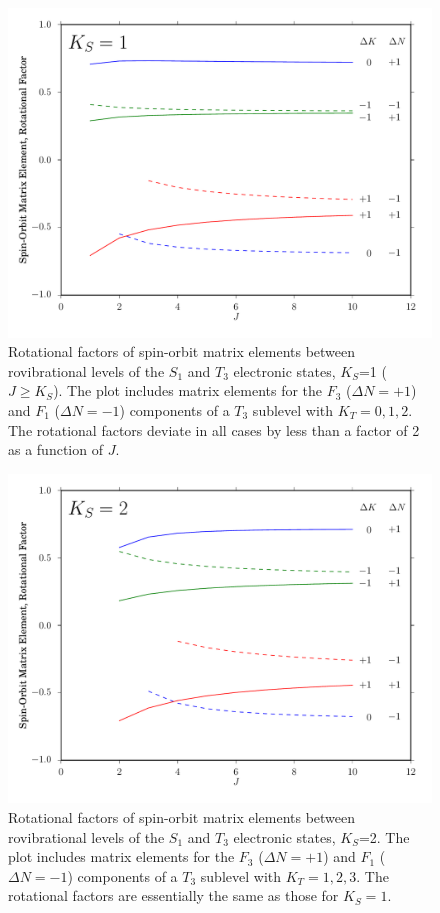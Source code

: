 \documentclass[12pt]{mitthesis}
\begin{document}
\begin{figure}[p]
  \caption{Rotational factors of spin-orbit matrix elements between
    rovibrational levels of the $S_1$ and $T_3$ electronic states,
    $K_S$=1 ($J \ge K_S$).  The plot includes matrix elements for the
    $F_3$ ($\Delta N = +1$) and $F_1$ ($\Delta N = -1$) components of
    a $T_3$ sublevel with $K_T=0,1,2$.  The rotational factors deviate
    in all cases by less than a factor of 2 as a function of $J$.}
  \label{fig:rotational-factors-1}
  \centering
  \includegraphics[width=6in]{rotational-factors-k1.pdf}
\end{figure}

\begin{figure}[p]
  \caption{Rotational factors of spin-orbit matrix elements between
    rovibrational levels of the $S_1$ and $T_3$ electronic states,
    $K_S$=2.  The plot includes matrix elements for the $F_3$ ($\Delta
    N = +1$) and $F_1$ ($\Delta N = -1$) components of a $T_3$
    sublevel with $K_T=1,2,3$.  The rotational factors are essentially
    the same as those for $K_S=1$.}
  \label{fig:rotational-factors-2}
  \centering
  \includegraphics[width=6in]{rotational-factors-k2.pdf}
\end{figure}
\end{document}
